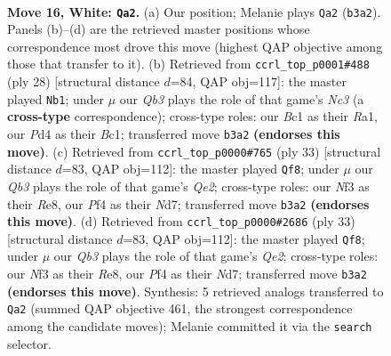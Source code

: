 \documentclass[11pt]{article}
\begin{document}
\clearpage

\begin{figure}[p]\centering
\begin{subfigure}{0.46\textwidth}\centering
\resizebox{\linewidth}{!}{%
\newchessgame
\chessboard[
  setfen={1rbq1r1k/p3b2p/npp3p1/3p1p1n/3P1P2/PQ3NP1/1P1NP1BP/R1B1R2K w - - 0 16},
  showmover=false,
  pgfstyle=straightmove, color=movearrow, markmove={b3-a2}
]}
\caption{}
\end{subfigure}\hfill
\begin{subfigure}{0.46\textwidth}\centering
\resizebox{\linewidth}{!}{%
\newchessgame
\chessboard[
  setfen={r4r1k/1ppqb1pp/p1n1b3/2Pp1p1n/1P1P1P2/P1NB4/4N1PP/R1BQ1RK1 w - - 1 15},
  showmover=false,
  pgfstyle=straightmove, color=movearrow, markmove={c3-b1}
]}
\caption{}
\end{subfigure}
\\[4pt]
\begin{subfigure}{0.46\textwidth}\centering
\resizebox{\linewidth}{!}{%
\newchessgame
\chessboard[
  setfen={r1b1r1k1/3nqpbp/pn1p2p1/2pP4/1p2PB2/3B1NNP/PP3PP1/2QRR1K1 b - - 5 17},
  showmover=false,
  pgfstyle=straightmove, color=movearrow, markmove={e7-f8}
]}
\caption{}
\end{subfigure}\hfill
\begin{subfigure}{0.46\textwidth}\centering
\resizebox{\linewidth}{!}{%
\newchessgame
\chessboard[
  setfen={r1b1r1k1/3nqpbp/pn1p2p1/2pP4/1p2PB2/3B1NNP/PP3PP1/2QRR1K1 b - - 5 17},
  showmover=false,
  pgfstyle=straightmove, color=movearrow, markmove={e7-f8}
]}
\caption{}
\end{subfigure}
\caption{\textbf{Move 16, White: \texttt{Qa2}.} (a) Our position; Melanie plays \texttt{Qa2} (\texttt{b3a2}). Panels (b)--(d) are the retrieved master positions whose correspondence most drove this move (highest QAP objective among those that transfer to it). (b) Retrieved from \texttt{ccrl\_top\_p0001\#488} (ply 28) [structural distance $d$=84, QAP obj=117]: the master played \texttt{Nb1}; under $\mu$ our \emph{Qb3} plays the role of that game's \emph{Nc3} (a \textbf{cross-type} correspondence); cross-type roles: our \emph{B}c1 as their \emph{R}a1, our \emph{P}d4 as their \emph{B}c1; transferred move \texttt{b3a2} \textbf{(endorses this move)}. (c) Retrieved from \texttt{ccrl\_top\_p0000\#765} (ply 33) [structural distance $d$=83, QAP obj=112]: the master played \texttt{Qf8}; under $\mu$ our \emph{Qb3} plays the role of that game's \emph{Qe2}; cross-type roles: our \emph{N}f3 as their \emph{R}e8, our \emph{P}f4 as their \emph{N}d7; transferred move \texttt{b3a2} \textbf{(endorses this move)}. (d) Retrieved from \texttt{ccrl\_top\_p0000\#2686} (ply 33) [structural distance $d$=83, QAP obj=112]: the master played \texttt{Qf8}; under $\mu$ our \emph{Qb3} plays the role of that game's \emph{Qe2}; cross-type roles: our \emph{N}f3 as their \emph{R}e8, our \emph{P}f4 as their \emph{N}d7; transferred move \texttt{b3a2} \textbf{(endorses this move)}. Synthesis: 5 retrieved analogs transferred to \texttt{Qa2} (summed QAP objective 461, the strongest correspondence among the candidate moves); Melanie committed it via the \texttt{search} selector.}
\label{fig:thought-m30}
\end{figure}
\end{document}
